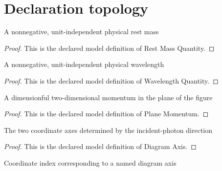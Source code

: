 \section{Declaration topology}
\begin{definition}
  \label{def:physics:phyx-mini-0613:phyxminiproblems-problemphyxmini0613-restmassquantity}
  A nonnegative, unit-independent physical rest mass
\end{definition}
\begin{proof}
  This is the declared model definition of Rest Mass Quantity.
\end{proof}
\begin{definition}
  \label{def:physics:phyx-mini-0613:phyxminiproblems-problemphyxmini0613-wavelengthquantity}
  A nonnegative, unit-independent physical wavelength
\end{definition}
\begin{proof}
  This is the declared model definition of Wavelength Quantity.
\end{proof}
\begin{definition}
  \label{def:physics:phyx-mini-0613:phyxminiproblems-problemphyxmini0613-planemomentum}
  A dimensionful two-dimensional momentum in the plane of the figure
\end{definition}
\begin{proof}
  This is the declared model definition of Plane Momentum.
\end{proof}
\begin{definition}
  \label{def:physics:phyx-mini-0613:phyxminiproblems-problemphyxmini0613-diagramaxis}
  The two coordinate axes determined by the incident-photon direction
\end{definition}
\begin{proof}
  This is the declared model definition of Diagram Axis.
\end{proof}
\begin{definition}[to Fin]
  \label{def:physics:phyx-mini-0613:phyxminiproblems-problemphyxmini0613-diagramaxis-tofin}
  Coordinate index corresponding to a named diagram axis
\end{definition}
